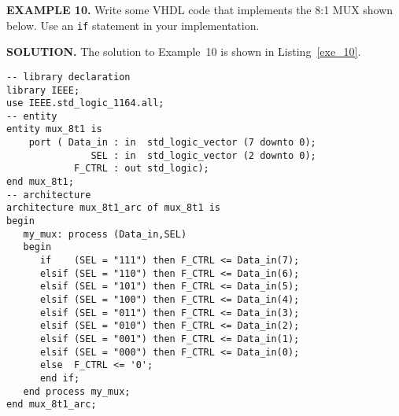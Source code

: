 \begin{leftbar}
\noindent
\begin{minipage}{0.45\linewidth}
\textbf{EXAMPLE 10.}
Write some VHDL code that implements the 8:1 MUX shown below. Use an \texttt{if} statement in your implementation.\\
\end{minipage}
\begin{minipage}{0.5\linewidth}
\begin{flushright}
\end{flushright}
\end{minipage}

\end{leftbar}
\noindent
\textbf{SOLUTION.} The solution to Example~10 is shown in Listing~\ref{exe_10}.

\noindent
\begin{minipage}{0.99\linewidth}
\begin{lstlisting}[label=exe_10, caption=Solution to Example~10.]
-- library declaration
library IEEE;
use IEEE.std_logic_1164.all;
-- entity
entity mux_8t1 is
    port ( Data_in : in  std_logic_vector (7 downto 0);
               SEL : in  std_logic_vector (2 downto 0);
            F_CTRL : out std_logic);  
end mux_8t1;
-- architecture
architecture mux_8t1_arc of mux_8t1 is 
begin
   my_mux: process (Data_in,SEL)
   begin
      if    (SEL = "111") then F_CTRL <= Data_in(7); 
      elsif (SEL = "110") then F_CTRL <= Data_in(6); 
      elsif (SEL = "101") then F_CTRL <= Data_in(5); 
      elsif (SEL = "100") then F_CTRL <= Data_in(4); 
      elsif (SEL = "011") then F_CTRL <= Data_in(3); 
      elsif (SEL = "010") then F_CTRL <= Data_in(2); 
      elsif (SEL = "001") then F_CTRL <= Data_in(1); 
      elsif (SEL = "000") then F_CTRL <= Data_in(0); 
      else  F_CTRL <= '0'; 
      end if;    
   end process my_mux; 
end mux_8t1_arc; 
\end{lstlisting}
\end{minipage}

